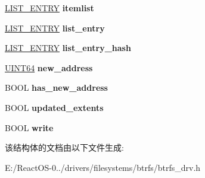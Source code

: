 \begin{DoxyCompactItemize}
\mbox{\label{struct__tree_a52bdc1a526ddd1d159b541dcccfd99c2}} 
\hyperlink{struct___l_i_s_t___e_n_t_r_y}{L\+I\+S\+T\+\_\+\+E\+N\+T\+RY} {\bfseries itemlist}
\item 
\mbox{\label{struct__tree_a09e9545731fe75ea26340136ad849f6f}} 
\hyperlink{struct___l_i_s_t___e_n_t_r_y}{L\+I\+S\+T\+\_\+\+E\+N\+T\+RY} {\bfseries list\+\_\+entry}
\item 
\mbox{\label{struct__tree_ad66baa9be784b7421472ad615c426a7a}} 
\hyperlink{struct___l_i_s_t___e_n_t_r_y}{L\+I\+S\+T\+\_\+\+E\+N\+T\+RY} {\bfseries list\+\_\+entry\+\_\+hash}
\item 
\mbox{\label{struct__tree_ae6dbc2a1c3a8182e12937eb277cb1216}} 
\hyperlink{_processor_bind_8h_a57be03562867144161c1bfee95ca8f7c}{U\+I\+N\+T64} {\bfseries new\+\_\+address}
\item 
\mbox{\label{struct__tree_a494623260ee184196c37a2c70c98e9a9}} 
B\+O\+OL {\bfseries has\+\_\+new\+\_\+address}
\item 
\mbox{\label{struct__tree_acb0271228d82f3af1e09da76c5736e1f}} 
B\+O\+OL {\bfseries updated\+\_\+extents}
\item 
\mbox{\label{struct__tree_a865d825dfff23539eac0d8be9b3db25e}} 
B\+O\+OL {\bfseries write}
\end{DoxyCompactItemize}


该结构体的文档由以下文件生成\+:\begin{DoxyCompactItemize}
\item 
E\+:/\+React\+O\+S-\/0../drivers/filesystems/btrfs/btrfs\+\_\+drv.\+h\end{DoxyCompactItemize}
